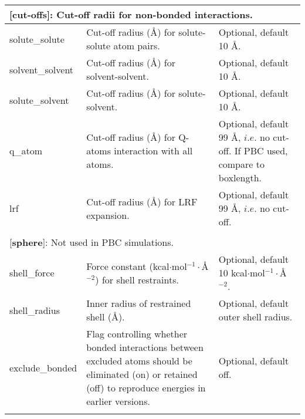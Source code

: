 \documentclass[a4paper,11pt]{article}
\begin{document}
\begin{longtable}{|p{78pt}|p{158pt}|p{158pt}|}
\multicolumn{3}{p{394pt}}{[\textbf{cut-offs}]: Cut-off radii for non-bonded interactions.}\\
\hline solute\_solute & Cut-off radius ({\AA}) for solute-solute atom pairs. & Optional, default 10 {\AA}.\\
\hline solvent\_solvent & Cut-off radius ({\AA}) for solvent-solvent. & Optional, default 10 {\AA}.\\
\hline solute\_solvent & Cut-off radius ({\AA}) for solute-solvent. & Optional, default 10 {\AA}.\\
\hline q\_atom & Cut-off radius ({\AA}) for Q-atoms interaction with all atoms. & Optional, default 99 {\AA}, \emph{$i.e.$} no cut-off. If PBC used, compare to boxlength.\\
\hline lrf & Cut-off radius ({\AA}) for LRF expansion. & Optional, default 99 {\AA}, \emph{$i.e.$} no cut-off.\\
\hline
\multicolumn{3}{p{394pt}}{}\\

\multicolumn{3}{p{394pt}}{[\textbf{sphere}]: Not used in PBC simulations.}\\
\hline shell\_force & Force constant (kcal$\cdot$mol$^{-1}\cdot${\AA}$^{-2}$) for shell restraints. & Optional, default 10 kcal$\cdot$mol$^{-1}\cdot${\AA}$^{-2}$.\\
\hline shell\_radius & Inner radius of restrained shell (\AA). & Optional, default outer shell radius.\\
\hline exclude\_bonded & Flag controlling whether bonded interactions between excluded atoms should be eliminated (on) or retained (off) to reproduce energies in earlier versions. & Optional, default off.\\
\hline
\multicolumn{3}{p{394pt}}{}\\


\end{longtable}
\end{document}
